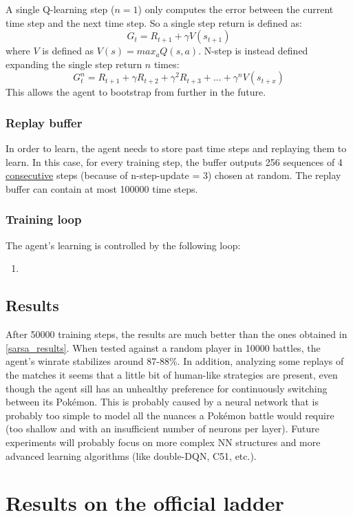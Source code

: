 \documentclass{article}
\begin{document}
A single Q-learning step ($n=1$) only computes the error between the current time step and the next time step.
So a single step return is defined as:
\begin{equation}
    G_t=R_{t+1}+\gamma V(s_{t+1})
\end{equation}
where $V$ is defined as $V(s)=max_aQ(s, a)$.
N-step is instead defined expanding the single step return $n$ times:
\begin{equation}
    G_t^n=R_{t+1}+\gamma R_{t+2}+\gamma^2R_{t+3}+...+\gamma^nV(s_{t+x})
\end{equation}
This allows the agent to bootstrap from further in the future.

\subsubsection{Replay buffer}

In order to learn, the agent needs to store past time steps and replaying them to learn.
In this case, for every training step, the buffer outputs 256 sequences of 4 \underline{consecutive} steps (because of n-step-update = 3) chosen at random.
The replay buffer can contain at most 100000 time steps.

\subsubsection{Training loop}

The agent's learning is controlled by the following loop:
\begin{enumerate}
    \item 
\end{enumerate}

\subsection{Results}

After 50000 training steps, the results are much better than the ones obtained in \ref{sarsa_results}.
When tested against a random player in 10000 battles, the agent's winrate stabilizes around 87-88\%.
In addition, analyzing some replays of the matches it seems that a little bit of human-like strategies are present, even though the agent sill has an unhealthy preference for continuously switching between its Pokémon.
This is probably caused by a neural network that is probably too simple to model all the nuances a Pokémon battle would require (too shallow and with an insufficient number of neurons per layer).
Future experiments will probably focus on more complex NN structures and more advanced learning algorithms (like double-DQN, C51, etc.).


\section{Results on the official ladder}

\clearpage

\printbibliography
\end{document}
